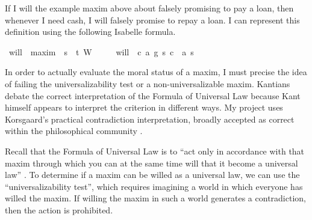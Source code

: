 \begin{isabellebody}
\begin{isamarkuptext}
If I will the example maxim above about falsely promising to pay a loan, then whenever I need cash, 
I will falsely promise to repay a loan. I can represent this definition using the following Isabelle
formula.%
\end{isamarkuptext}\isamarkuptrue%
\isamarkupfalse%
\ will\ {\isacharcolon}{\isacharcolon}\ {\isachardoublequoteopen}maxim\ {\isasymRightarrow}\ s{\isasymRightarrow}\ \ t{\isachardoublequoteclose}\ {\isacharparenleft}{\isachardoublequoteopen}W\ {\isacharunderscore}\ {\isacharunderscore}{\isachardoublequoteclose}{\isacharparenright}\isanewline
\ \ \ {\isachardoublequoteopen}will\ {\isasymequiv}\ {\isasymlambda}{\isacharparenleft}c{\isacharcomma}\ a{\isacharcomma}\ g{\isacharparenright}\ s{\isachardot}\ {\isacharparenleft}c\ \isactrlbold {\isasymrightarrow}\ {\isacharparenleft}a\ s{\isacharparenright}{\isacharparenright}{\isachardoublequoteclose}\isanewline
%
%
\isadelimdocument
%
\endisadelimdocument
%
\isatagdocument
%
\isamarkuptrue%
%
\endisatagdocument
{\isafolddocument}%
%
\isadelimdocument
%
\endisadelimdocument
%
\begin{isamarkuptext}%
In order to actually evaluate the moral status of a maxim, I must precise the idea of failing
the universalizability test or a non-universalizable maxim.  Kantians debate the correct interpretation of 
the Formula of Universal Law because Kant himself appears to interpret the criterion in different ways. 
My project uses Korsgaard's practical contradiction interpretation, broadly accepted as correct within 
the philosophical community \citep{ebelsduggan}.
 
Recall that the Formula of Universal Law is to “act only in accordance with that maxim through which 
you can at the same time will that it become a universal law” \citep{groundwork}. To determine if a 
maxim can be willed as a universal law, we can use the “universalizability test”, which requires 
imagining a world in which everyone has willed the maxim. If willing the maxim in such a world 
generates a contradiction, then the action is prohibited. 


\end{isamarkuptext}
\end{isabellebody}
